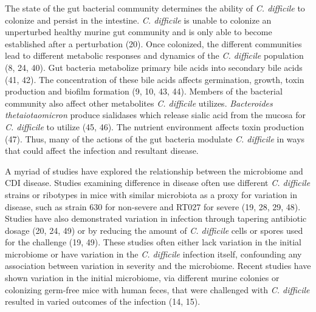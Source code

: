 \documentclass[
  12pt,
]{article}
\begin{document}
The state of the gut bacterial community determines the ability of
\emph{C. difficile} to colonize and persist in the intestine. \emph{C.
difficile} is unable to colonize an unperturbed healthy murine gut
community and is only able to become established after a perturbation
(20). Once colonized, the different communities lead to different
metabolic responses and dynamics of the \emph{C. difficile} population
(8, 24, 40). Gut bacteria metabolize primary bile acids into secondary
bile acids (41, 42). The concentration of these bile acids affects
germination, growth, toxin production and biofilm formation (9, 10, 43,
44). Members of the bacterial community also affect other metabolites
\emph{C. difficile} utilizes. \emph{Bacteroides thetaiotaomicron}
produce sialidases which release sialic acid from the mucosa for
\emph{C. difficile} to utilize (45, 46). The nutrient environment
affects toxin production (47). Thus, many of the actions of the gut
bacteria modulate \emph{C. difficile} in ways that could affect the
infection and resultant disease.

A myriad of studies have explored the relationship between the
microbiome and CDI disease. Studies examining difference in disease
often use different \emph{C. difficile} strains or ribotypes in mice
with similar microbiota as a proxy for variation in disease, such as
strain 630 for non-severe and RT027 for severe (19, 28, 29, 48). Studies
have also demonstrated variation in infection through tapering
antibiotic dosage (20, 24, 49) or by reducing the amount of \emph{C.
difficile} cells or spores used for the challenge (19, 49). These
studies often either lack variation in the initial microbiome or have
variation in the \emph{C. difficile} infection itself, confounding any
association between variation in severity and the microbiome. Recent
studies have shown variation in the initial microbiome, via different
murine colonies or colonizing germ-free mice with human feces, that were
challenged with \emph{C. difficile} resulted in varied outcomes of the
infection (14, 15).
\end{document}
